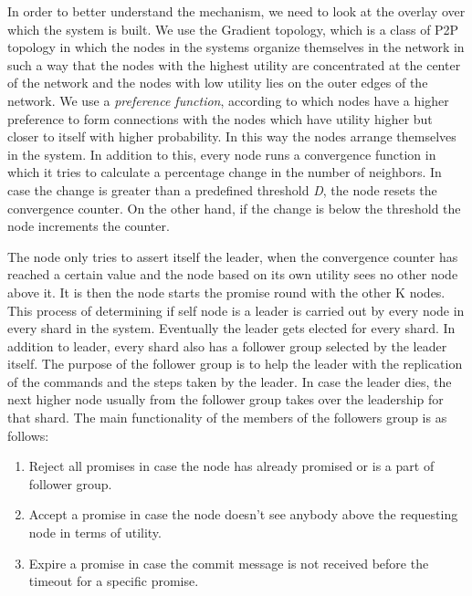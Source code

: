 \documentclass[a4paper, 11pt]{article}
\begin{document}
\par In order to better understand the mechanism, we need to look at the overlay over which the system is built. We use the Gradient topology, which is a class of P2P topology in which the nodes in the systems organize themselves in the network in such a way that the nodes with the highest utility  are concentrated at the center of the network and the nodes with low utility lies on the outer edges of the network. We use a \textit{preference function}, according to which nodes have a higher preference to form connections with the nodes which have utility higher but closer to itself with higher probability. In this way the nodes arrange themselves in the system. In addition to this, every node runs a convergence function in which it tries to calculate a percentage change in the number of neighbors. In case the change is greater than a predefined threshold \textit{D}, the node resets the convergence counter. On the other hand, if the change is below the threshold the node increments the counter. 
\par The node only tries to assert itself the leader, when the convergence counter has reached a certain value and the node based on its own utility sees no other node above it. It is then the node starts the promise round with the other K nodes. This process of determining if self node is a leader is carried out by every node in every shard in the system. Eventually the leader gets elected for every shard. In addition to leader, every shard also has a follower group selected by the leader itself. The purpose of the follower group is to help the leader with the replication of the commands and the steps taken by the leader. In case the leader dies, the next higher node usually from the follower group takes over the leadership for that shard. The main functionality of the members of the followers group is as follows:


\begin{enumerate}

\item Reject all promises in case the node has already promised or is a part of follower group.

\item Accept a promise in case the node doesn't see anybody above the requesting node in terms of utility.

\item Expire a promise in case the commit message is not received before the timeout for a specific promise.

\end{enumerate}
\end{document}
